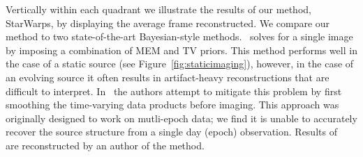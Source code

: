 Vertically within each quadrant we illustrate the results of our method, StarWarps, by displaying the average frame reconstructed. 
We compare our method to two state-of-the-art Bayesian-style methods.~\cite{andrew} solves for a single image by imposing a combination of MEM and TV priors. This method performs well in the case of a static source (see Figure~\ref{fig:staticimaging}), however, in the case of an evolving source it often results in artifact-heavy reconstructions that are difficult to interpret. In~\cite{freek} the authors attempt to mitigate this problem by first smoothing the time-varying data products before imaging.
This approach was originally designed to work on mutli-epoch data; we find it is unable to accurately recover the source structure from a single day (epoch) observation. 
Results of~\cite{freek} are reconstructed by an author of the method. 









